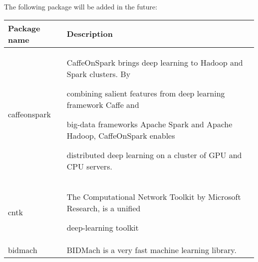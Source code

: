 \documentclass[]{article}
\begin{document}
The following package will be added in the future:



\begin{longtable}[]{@{}ll@{}}

\toprule

\begin{minipage}[b]{0.17\columnwidth}\raggedright\strut

Package name\strut

\end{minipage} & \begin{minipage}[b]{0.18\columnwidth}\raggedright\strut

Description\strut

\end{minipage}\tabularnewline

\midrule

\endhead

\begin{minipage}[t]{0.17\columnwidth}\raggedright\strut

caffeonspark\strut

\end{minipage} & \begin{minipage}[t]{0.18\columnwidth}\raggedright\strut

CaffeOnSpark brings deep learning to Hadoop and Spark clusters. By

combining salient features from deep learning framework Caffe and

big-data frameworks Apache Spark and Apache Hadoop, CaffeOnSpark enables

distributed deep learning on a cluster of GPU and CPU servers.\strut

\end{minipage}\tabularnewline

\begin{minipage}[t]{0.17\columnwidth}\raggedright\strut

cntk\strut

\end{minipage} & \begin{minipage}[t]{0.18\columnwidth}\raggedright\strut

The Computational Network Toolkit by Microsoft Research, is a unified

deep-learning toolkit\strut

\end{minipage}\tabularnewline

\begin{minipage}[t]{0.17\columnwidth}\raggedright\strut

bidmach\strut

\end{minipage} & \begin{minipage}[t]{0.18\columnwidth}\raggedright\strut

BIDMach is a very fast machine learning library.\strut

\end{minipage}\tabularnewline

\bottomrule

\end{longtable}
\end{document}
